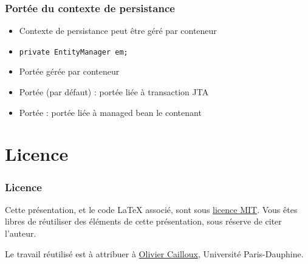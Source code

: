 \documentclass[english, french]{beamer}
\begin{document}
\begin{frame}
	\frametitle{Portée du contexte de persistance}
	\begin{itemize}
		\item Contexte de persistance peut être géré par conteneur
		\item {} \texttt{private EntityManager em;}
		\item Portée gérée par conteneur
		\item Portée  (par défaut) : portée liée à transaction JTA
		\item Portée  : portée liée à managed bean le contenant
	\end{itemize}
\end{frame}

\section{Licence}
\begin{frame}
	\frametitle{Licence}
	Cette présentation, et le code LaTeX associé, sont sous \href{http://opensource.org/licenses/MIT}{licence MIT}. Vous êtes libres de réutiliser des éléments de cette présentation, sous réserve de citer l’auteur.
	
	Le travail réutilisé est à attribuer à \href{http://www.lamsade.dauphine.fr/~ocailloux/}{Olivier Cailloux}, Université Paris-Dauphine.
\end{frame}
\end{document}
